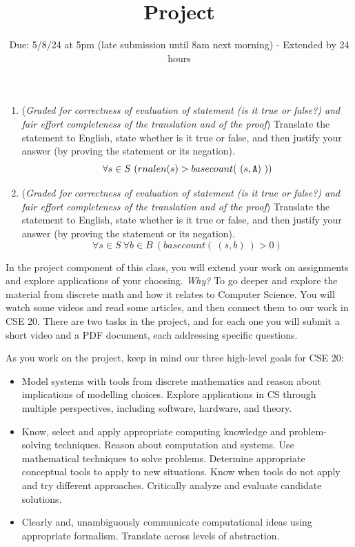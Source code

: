 \begin{enumerate}[labelindent=0pt, leftmargin=0pt]
\begin{enumerate}
\item ({\it Graded for correctness of evaluation of statement (is it true or false?) 
and fair effort completeness of the translation and of the proof}) 
Translate the statement to English, state whether is it true or false, and then justify your answer (by proving the statement or its negation).
$$\forall s \in S~ (rnalen(s) > basecount( ~(s,\texttt{A})~))$$

\item ({\it Graded for correctness of evaluation of statement (is it true or false?) 
and fair effort completeness of the translation and of the proof}) 
Translate the statement to English, state whether is it true or false, and then justify your answer (by proving the statement or its negation).
$$\forall s \in S~ \forall b \in B ~( basecount( ~(s,b)~) > 0)$$

\end{enumerate}

\end{enumerate}

\newpage

\setlength{\parindent}{0em}
\setlength{\parskip}{0em}

\title{Project}
\date{Due: 5/8/24 at 5pm (late submission until 8am next morning) - Extended by 24 hours}


\maketitle
\thispagestyle{fancy}

\vspace{-20pt}

In the project component of this class, you will extend your 
work on assignments and explore applications of your choosing. 
{\it Why?}
To go deeper and explore the material from discrete math and how it relates to Computer Science.
You will watch some videos and read some articles, and then connect them to our work in CSE 20. There 
are two tasks in the project, and for each one you will submit a short video and a PDF document, each 
addressing specific questions.


As you work on the project, keep in mind our three high-level goals for CSE 20:
\begin{itemize}
\item Model systems with tools from discrete mathematics and reason about implications 
of modelling choices. Explore applications in CS through multiple perspectives, including software, hardware, and theory.
\item Know, select and apply appropriate computing knowledge and problem-solving techniques. Reason about computation and systems. Use mathematical techniques to solve problems. Determine appropriate conceptual tools to apply to new situations. Know when tools do not apply and try different approaches. Critically analyze and evaluate candidate solutions.
\item Clearly and, unambiguously communicate computational ideas using appropriate formalism. Translate across levels of abstraction.
\end{itemize}


